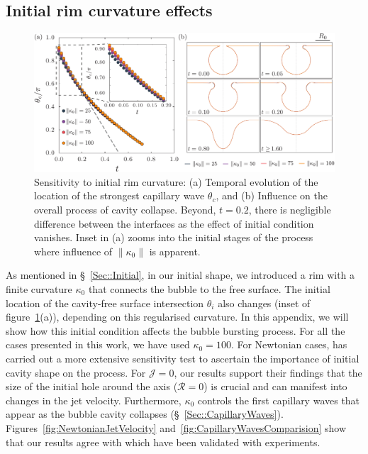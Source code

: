 \documentclass[final]{jfm}
\begin{document}
\subsection{Initial rim curvature effects}\label{App::FilletCurvature}
\begin{figure}
	\centerline{\includegraphics[width=\linewidth]{FigureE3_Kappa0-eps-converted-to.pdf}}%
	\caption{Sensitivity to initial rim curvature: (a) Temporal evolution of the location of the strongest capillary wave $\theta_c$, and (b) Influence on the overall process of cavity collapse. Beyond, $t = 0.2$, there is negligible difference between the interfaces as the effect of initial condition vanishes. Inset in (a) zooms into the initial stages of the process where influence of $\|\kappa_0\|$ is apparent.}
	\label{fig:kappa0}
\end{figure}
As mentioned in \S~\ref{Sec::Initial}, in our initial shape, we introduced a rim with a finite curvature $\kappa_0$ that connects the bubble to the free surface. The initial location of the cavity-free surface intersection $\theta_i$ also changes (inset of figure~\ref{fig:kappa0}(a)), depending on this regularised curvature. In this appendix, we will show how this initial condition affects the bubble bursting process. For all the cases presented in this work, we have used $\kappa_0 = 100$. For Newtonian cases, \citet{deike2018dynamics} has carried out a more extensive sensitivity test to ascertain the importance of initial cavity shape on the process. For $\mathcal{J} = 0$, our results support their findings that the size of the initial hole around the axis ($\mathcal{R} = 0$) is crucial and can manifest into changes in the jet velocity. Furthermore, $\kappa_0$ controls the first capillary waves that appear as the bubble cavity collapses (\S~\ref{Sec::CapillaryWaves}). Figures~\ref{fig:NewtonianJetVelocity} and~\ref{fig:CapillaryWavesComparision} show that our results agree with \cite{deike2018dynamics, gordillo2019capillary} which have been validated with experiments.
\end{document}
